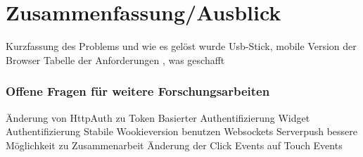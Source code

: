 \chapter{Zusammenfassung/Ausblick} 
\label{Kapitel 7}
Kurzfassung des Problems und wie es gelöst wurde
Usb-Stick, mobile Version der Browser
Tabelle der Anforderungen , was geschafft


\subsection{Offene Fragen für weitere Forschungsarbeiten}
Änderung von HttpAuth zu Token Basierter Authentifizierung
Widget Authentifizierung
Stabile Wookieversion benutzen
Websockets
Serverpush
bessere Möglichkeit zu Zusammenarbeit
Änderung der Click Events auf Touch Events



